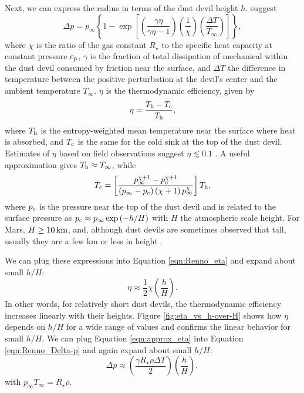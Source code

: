 \documentclass{aastex63}
\begin{document}
Next, we can express the radius in terms of the dust devil height $h$. \citet{1998JAtS...55.3244R} suggest
\begin{equation}
    \Delta p = p_{\infty} \left\{ 1 - \exp \left[ \left( \dfrac{\gamma \eta}{\gamma \eta - 1}\right) \left(\dfrac{1}{\chi}\right) \left( \dfrac{\Delta T}{T_{\infty}}\right) \right] \right\}\label{eqn:Renno_Delta-p},
\end{equation}
where $\chi$ is the ratio of the gas constant $R_\star$ to the specific heat capacity at constant pressure $c_{\rm p}$, $\gamma$ is the fraction of total dissipation of mechanical within the dust devil consumed by friction near the surface, and $\Delta T$ the difference in temperature between the positive perturbation at the devil's center and the ambient temperature $T_\infty$. $\eta$ is the thermodynamic efficiency, given by 
\begin{equation}
    \eta = \dfrac{T_{\rm h} - T_{\rm c}}{T_{\rm h}}\label{eqn:Renno_eta},
\end{equation}{}
where $T_{\rm h}$ is the entropy-weighted mean temperature near the surface where heat is absorbed, and $T_{\rm c}$ is the same for the cold sink at the top of the dust devil. Estimates of $\eta$ based on field observations suggest $\eta \lesssim 0.1$ \citep[e.g.][]{2000JGR...105.1859R}. A useful approximation gives $T_{\rm h} \approx T_\infty$, while
\begin{equation}
    T_{\rm c} = \left[ \dfrac{ p_\infty^{\chi + 1} - p_{c}^{\chi + 1} }{\left( p_\infty - p_{c} \right) \left( \chi + 1\right) p_\infty^{\chi}} \right] T_{\rm h},\label{eqn:Tc}
\end{equation}
where $p_{\rm c}$ is the pressure near the top of the dust devil and is related to the surface pressure as $p_{\rm c} \approx p_\infty \exp\left(-h/H\right)$ with $H$ the atmospheric scale height. For Mars, $H \ge 10\,{\rm km}$, and, although dust devils are sometimes observed that tall, usually they are a few km or less in height \citep{2008Icar..197...39S}. 

We can plug these expressions into Equation \ref{eqn:Renno_eta} and expand about small $h/H$:
\begin{equation}
    \eta \approx \frac{1}{2} \chi \left( \dfrac{h}{H} \right).\label{eqn:approx_eta}
\end{equation}
In other words, for relatively short dust devils, the thermodynamic efficiency increases linearly with their heights. Figure \ref{fig:eta_vs_h-over-H} shows how $\eta$ depends on $h/H$ for a wide range of values and confirms the linear behavior for small $h/H$. We can plug Equation \ref{eqn:approx_eta} into Equation \ref{eqn:Renno_Delta-p} and again expand about small $h/H$:
\begin{equation}
    \Delta p \approx \left( \dfrac{\gamma R_\star \rho \Delta T}{2} \right) \left( \dfrac{h}{H} \right) \label{eqn:approx_Delta-p},
\end{equation}
with $p_\infty T_\infty = R_\star \rho$.
\end{document}
